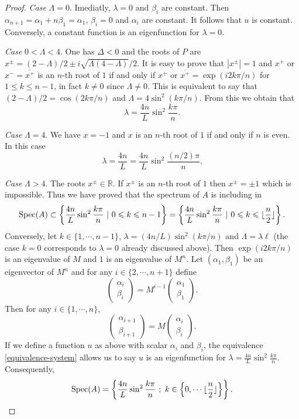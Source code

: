 \documentclass[12pt,english]{smfart} %
\theoremstyle{remark}
\newcommand{\R}{\mathbb{R}}
\begin{document}
\begin{proof}
\emph{Case} $\Lambda=0$. Imediatly, $\lambda=0$ and $\beta_i$ are constant. Then $\alpha_{n+1}=\alpha_1+n\beta_1=\alpha_1$, $\beta_i=0$ and $\alpha_i$ are constant. It follows that $u$ is constant. Conversely, a constant function is an eigenfunction for $\lambda=0$. 

 \emph{Case} $0<\Lambda<4$. One has $\Delta<0$ and the roots of $P$ are $x^{\pm}=(2-\Lambda)/2\pm i\sqrt{\Lambda(4-\Lambda)}/2$. It is easy to prove that $|x^{\pm}|=1$ and $x^+$ or $x^-=\overline{x^+}$ is an $n$-th root of $1$ if and only if $x^+$ or $\overline{x^+}=\exp(i2k\pi/n)$ for $1 \leqslant k \leqslant n-1$, in fact $k\neq0$ since $\Lambda\neq0$. This is  equivalent to say that $(2-\Lambda)/2=\cos(2k\pi/n)$ and $\Lambda=4\sin^2(k\pi/n)$.  From this we obtain that $$\lambda=\dfrac{4n}{L}\sin^2\dfrac{k\pi}{n}.$$ 
 
\emph{Case }$\Lambda=4$. We have $x=-1$ and $x$ is an $n$-th root of $1$ if and only if $n$ is even. In this case $$\lambda=\dfrac{4n}{L}=\dfrac{4n}{L}\sin^2\dfrac{(n/2)\pi}{n}.$$

\emph{Case } $\Lambda>4$. The roots $x^{\pm}\in\R$. If $x^{\pm}$ is an $n$-th root of $1$ then $x^{\pm}=\pm 1$ which is impossible. Thus  we have proved that the spectrum of $A$ is including in 
$$\textnormal{Spec}(A)\subset \left\{\frac{4n}{L}\sin^2\frac{k\pi}{n}\ \vert \ 0\leqslant k \leqslant n-1\right\}=\left\{\frac{4n}{L}\sin^2\frac{k\pi}{n}\ \vert\ 0 \leqslant k \leqslant \lfloor\dfrac{n}{2}\rfloor\right\}.$$
Conversely, let $k\in\{1,\cdots,n-1\}$, $\lambda=(4n/L)\sin^2(k\pi/n)$ and $\Lambda=\lambda\ell$ (the case $k=0$ corresponds to $\lambda=0$ already discussed above). Then $\exp(i2k\pi/n)$ is an eigenvalue of $M$ and $1$ is an eigenvalue of $M^n$. Let $(
\alpha_1,\beta_1)$ be an eigenvector of $M^n$ and for any $i\in\{2,\cdots,n+1\}$ define $$\begin{pmatrix}
\alpha_i\\\beta_i
\end{pmatrix}=M^{i-1}\begin{pmatrix}
\alpha_1\\\beta_1
\end{pmatrix}.$$ Then for any $i\in\{1,\cdots,n\}$, $$ \begin{pmatrix}
\alpha_{i+1}\\\beta_{i+1}
\end{pmatrix}=M\begin{pmatrix}
\alpha_i\\\beta_i
\end{pmatrix}.$$ If we define a function $u$ as above with scalar $\alpha_i$ and $\beta_i$, the equivalence \ref{equivalence-system} allows us to say $u$ is an eigenfunction for $\lambda=\frac{4n}{L}\sin^2\frac{k\pi}{n}$. Consequently, $$\textnormal{Spec}(A)=\left\{\frac{4n}{L}\sin^2\frac{k\pi}{n}\ ; \ k\in\left\{0,\cdots\lfloor\dfrac{n}{2}\rfloor\right\}\right\}.$$
\end{proof}  
    
\end{document}
